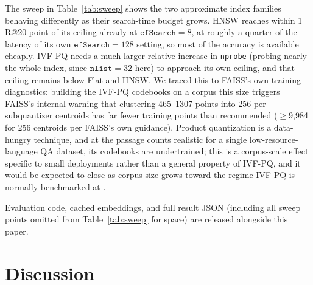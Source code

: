 \documentclass[conference]{IEEEtran}
\begin{document}
The sweep in Table~\ref{tab:sweep} shows the two approximate index families behaving differently as their search-time budget grows. HNSW reaches within 1 R@20 point of its ceiling already at $\texttt{efSearch}=8$, at roughly a quarter of the latency of its own $\texttt{efSearch}=128$ setting, so most of the accuracy is available cheaply. IVF-PQ needs a much larger relative increase in \texttt{nprobe} (probing nearly the whole index, since $\texttt{nlist}=32$ here) to approach its own ceiling, and that ceiling remains below Flat and HNSW. We traced this to FAISS's own training diagnostics: building the IVF-PQ codebooks on a corpus this size triggers FAISS's internal warning that clustering 465--1307 points into 256 per-subquantizer centroids has far fewer training points than recommended ($\geq$9{,}984 for 256 centroids per FAISS's own guidance). Product quantization is a data-hungry technique, and at the passage counts realistic for a single low-resource-language QA dataset, its codebooks are undertrained; this is a corpus-scale effect specific to small deployments rather than a general property of IVF-PQ, and it would be expected to close as corpus size grows toward the regime IVF-PQ is normally benchmarked at \cite{jegou2011product}.

Evaluation code, cached embeddings, and full result JSON (including all sweep points omitted from Table~\ref{tab:sweep} for space) are released alongside this paper.

\section{Discussion}
\end{document}
